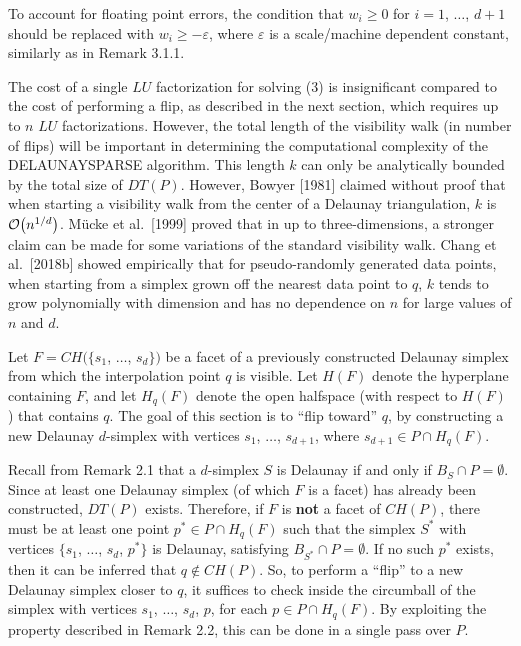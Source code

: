 {\enspace
To account for floating point errors, the condition that $w_i \geq 0$
for $i=1$, $\ldots$, $d+1$ should be replaced with $w_i \geq -\varepsilon$,
where $\varepsilon$ is a scale/machine dependent constant, similarly as in
Remark 3.1.1.
\medskip

The cost of a single $LU$ factorization for solving (3) is insignificant
compared to the cost of performing a flip, as described in the next
section, which requires up to $n$ $LU$ factorizations. However, the total
length of the visibility walk (in number of flips) will be important in
determining the computational complexity of the DELAUNAYSPARSE algorithm.
This length $k$ can only be analytically bounded by the total size of
$DT(P)$. However, Bowyer [1981] claimed without proof that when
starting a visibility walk from the center of a Delaunay triangulation,
$k$ is ${\cal O}\big(n^{1/d}\big)$.
M{\"u}cke et al.\ [1999] proved that in up to three-dimensions, a stronger
claim can be made for some variations of the standard visibility walk.
Chang et al.\ [2018b] showed empirically that for pseudo-randomly
generated data points, when starting from a simplex grown off the nearest
data point to $q$, $k$ tends to grow polynomially with dimension and has
no dependence on $n$ for large values of $n$ and $d$.


Let $F = CH(\{s_1$, $\ldots$, $s_d\})$ be a facet of a previously
constructed Delaunay simplex from which the interpolation point $q$
is visible. Let $H(F)$ denote the hyperplane containing $F$, and let
$H_q(F)$ denote the open halfspace (with respect to $H(F)$) that
contains $q$. The goal of this section is to ``flip toward'' $q$, by
constructing a new Delaunay $d$-simplex with vertices
$s_1$, $\ldots$, $s_{d+1}$, where $s_{d+1} \in P \cap H_q(F)$.

Recall from Remark 2.1 that a $d$-simplex $S$ is Delaunay if and only
if $B_S \cap P = \emptyset$. Since at least one Delaunay simplex
(of which $F$ is a facet) has already been constructed, $DT(P)$ exists.
Therefore, if $F$ is {\bf not} a facet of $CH(P)$, there must
be at least one point $p^*\in P \cap H_q(F)$ such that the simplex
$S^*$ with vertices $\{s_1$, $\ldots$, $s_d$, $p^*\}$ is Delaunay,
satisfying $B_{S^*} \cap P = \emptyset$. If no such $p^*$ exists,
then it can be inferred that $q \not\in CH(P)$.
So, to perform a ``flip'' to a new Delaunay simplex
closer to $q$, it suffices to check inside the circumball of the
simplex with vertices $s_1$, $\ldots$, $s_d$, $p$, for each
$p \in P \cap H_q(F)$. By exploiting the property described in
Remark 2.2, this can be done in a single pass over $P$.

}
